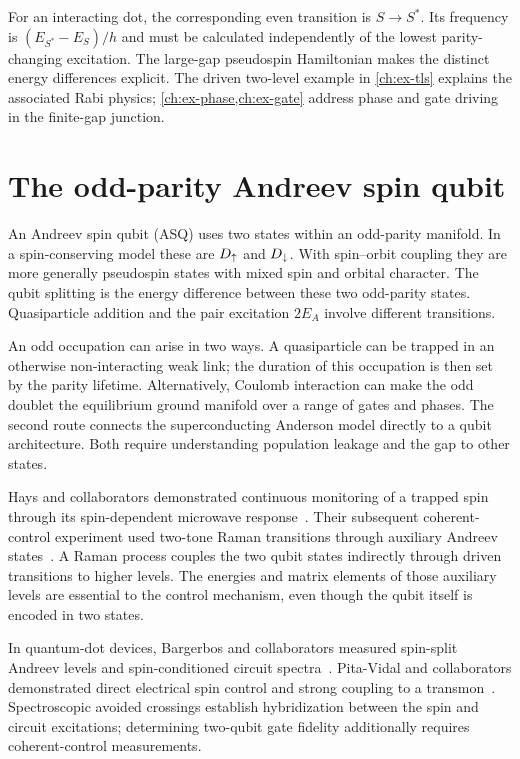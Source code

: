 For an interacting dot, the corresponding even transition is $S\to S^*$.
Its frequency is $(E_{S^*}-E_S)/h$ and must be calculated independently of the lowest
parity-changing excitation. The large-gap pseudospin Hamiltonian makes the
distinct energy differences explicit. The driven two-level example in \cref{ch:ex-tls}
explains the associated Rabi physics; \cref{ch:ex-phase,ch:ex-gate} address
phase and gate driving in the finite-gap junction.

\section{The odd-parity Andreev spin qubit}\label{sec:spin-qubit}

An Andreev spin qubit (ASQ) uses two states within an odd-parity manifold. In a
spin-conserving model these are $D_{\uparrow}$ and $D_{\downarrow}$. With spin--orbit coupling
they are more generally pseudospin states with mixed spin and orbital character.
The qubit splitting is the energy difference between these two odd-parity states.
Quasiparticle addition and the pair excitation $2E_A$ involve different transitions.

An odd occupation can arise in two ways. A quasiparticle can be trapped
in an otherwise non-interacting weak link; the duration of this occupation is then
set by the parity lifetime. Alternatively, Coulomb interaction can make the odd doublet the
equilibrium ground manifold over a range of gates and phases. The second route
connects the superconducting Anderson model directly to a qubit architecture.
Both require understanding population leakage and the gap to other states.

Hays and collaborators demonstrated continuous monitoring of a trapped spin
through its spin-dependent microwave response~\cite{hays2020continuous}. Their
subsequent coherent-control experiment used two-tone Raman transitions through
auxiliary Andreev states~\cite{hays2021coherent}. A Raman process couples the
two qubit states indirectly through driven transitions to higher levels. The
energies and matrix elements of those auxiliary levels are essential to the
control mechanism, even though the qubit itself is encoded in two states.

In quantum-dot devices, Bargerbos and collaborators measured spin-split
Andreev levels and spin-conditioned circuit spectra~\cite{bargerbos2023spectroscopy}.
Pita-Vidal and collaborators demonstrated direct electrical spin control and
strong coupling to a transmon~\cite{pitavidal2023direct}. Spectroscopic avoided
crossings establish hybridization between the spin and circuit excitations;
determining two-qubit gate fidelity additionally requires coherent-control measurements.

